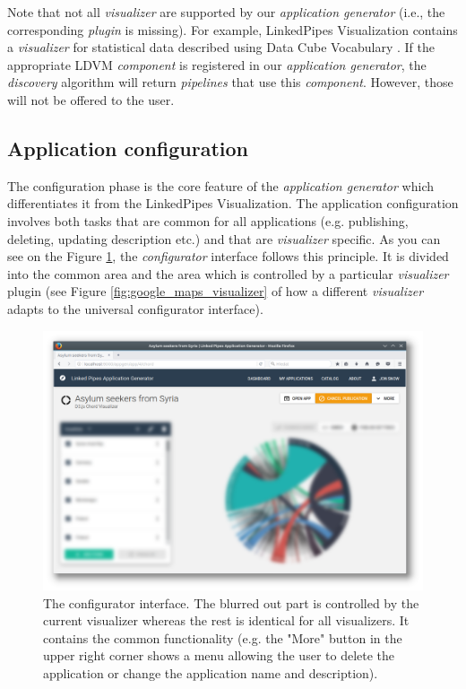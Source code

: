 Note that not all \emph{visualizer} are supported by our \emph{application generator} (i.e., the corresponding \emph{plugin} is missing). For example, LinkedPipes Visualization contains a \emph{visualizer} for statistical data described using Data Cube Vocabulary \cite{datacube_vocabulary}. If the appropriate LDVM \emph{component} is registered in our \emph{application generator}, the \emph{discovery} algorithm will return \emph{pipelines} that use this \emph{component}. However, those will not be offered to the user.

\subsection{Application configuration}

The configuration phase is the core feature of the \emph{application generator} which differentiates it from the LinkedPipes Visualization. The application configuration involves both tasks that are common for all applications (e.g. publishing, deleting, updating description etc.) and that are \emph{visualizer} specific. As you can see on the Figure \ref{fig:configurator}, the \emph{configurator} interface follows this principle. It is divided into the common area and the area which is controlled by a particular \emph{visualizer} plugin (see Figure \ref{fig:google_maps_visualizer} of how a different \emph{visualizer} adapts to the universal configurator interface). 

\begin{figure}
	\centering
	\includegraphics[width=145mm]{img/05_configurator.png}
	\caption{The configurator interface. The blurred out part is controlled by the current visualizer whereas the rest is identical for all visualizers. It contains the common functionality (e.g. the "More" button in the upper right corner shows a menu allowing the user to delete the application or change the application name and description).}
    \label{fig:configurator}
\end{figure}

